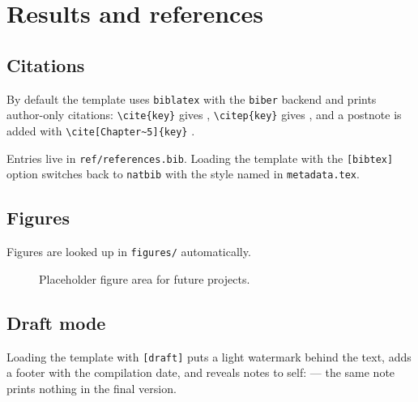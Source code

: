 \chapter{Results and references}

\section{Citations}

By default the template uses \texttt{biblatex} with the \texttt{biber} backend
and prints author-only citations: \verb|\cite{key}| gives \cite{sample-reference},
\verb|\citep{key}| gives \citep{sample-reference}, and a postnote is added with
\verb|\cite[Chapter~5]{key}| \cite[Chapter~5]{sample-reference}.

Entries live in \texttt{ref/references.bib}. Loading the template with the
\texttt{[bibtex]} option switches back to \texttt{natbib} with the style named
in \texttt{metadata.tex}.

\section{Figures}

Figures are looked up in \texttt{figures/} automatically.

\begin{figure}[H]
    \centering
    \fbox{\rule{0pt}{4cm}\rule{0.7\textwidth}{0pt}}
    \caption{Placeholder figure area for future projects.}
\end{figure}

\section{Draft mode}

Loading the template with \texttt{[draft]} puts a light watermark behind the
text, adds a footer with the compilation date, and reveals notes to
self:  --- the same note prints nothing in the final
version. 
